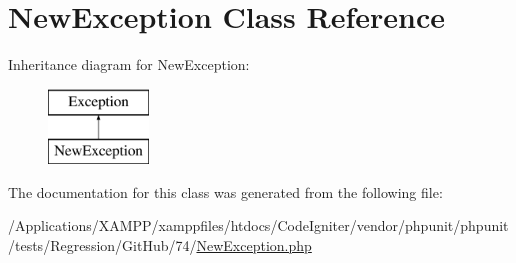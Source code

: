 \hypertarget{class_new_exception}{}\section{New\+Exception Class Reference}
\label{class_new_exception}
Inheritance diagram for New\+Exception\+:\begin{figure}[H]
\begin{center}
\leavevmode
\includegraphics[height=2.000000cm]{class_new_exception}
\end{center}
\end{figure}


The documentation for this class was generated from the following file\+:\begin{DoxyCompactItemize}
\item 
/\+Applications/\+X\+A\+M\+P\+P/xamppfiles/htdocs/\+Code\+Igniter/vendor/phpunit/phpunit/tests/\+Regression/\+Git\+Hub/74/\mbox{\hyperlink{_new_exception_8php}{New\+Exception.\+php}}\end{DoxyCompactItemize}
